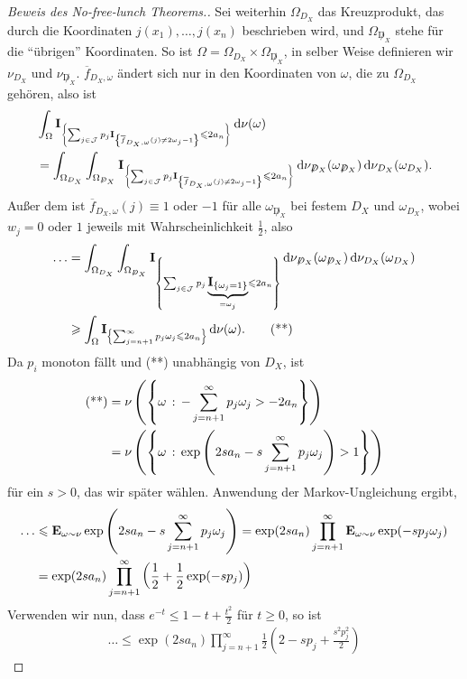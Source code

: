 \begin{proof}[Beweis des No-free-lunch Theorems.]
Sei weiterhin $\Omega_{D_X}$ das Kreuzprodukt, das durch die Koordinaten
$j(x_1),\ldots,j(x_n)$ beschrieben wird, und $\Omega_{\not
D_X}$ stehe für die ``übrigen'' Koordinaten. So ist $\Omega =
\Omega_{D_X}\times \Omega_{\not D_X}$, in selber Weise definieren wir
$\nu_{D_X}$ und $\nu_{\not D_X}$. $\overline{f}_{D_X,\omega}$ ändert sich nur
in den Koordinaten von $\omega$, die zu $\Omega_{D_X}$ gehören, also ist
\begin{align*}
&\int_\Omega \mathbf{I}_{\left\{ \sum_{j\in\mathcal{J}} p_j
\mathbf{I}_{\left\{ \overline{f}_{D_X,\omega}(j)\neq 2\omega_j -1 \right\}}\leqslant
2a_n \right\}}\,\mathrm{d} \nu(\omega)\\
&=\int_{\Omega_{D_X}} \int_{\Omega_{\not D_X}} \mathbf{I}_{\left\{ \sum_{j\in\mathcal{J}} p_j
\mathbf{I}_{\left\{ \overline{f}_{D_X,\omega}(j)\neq 2\omega_j -1 \right\}}\leqslant
2a_n \right\}}\,\mathrm{d} \nu_{\not D_X}(\omega_{\not D_X})\,\mathrm{d} \nu_{D_X}(\omega_{D_X}).
\end{align*}
Außer dem ist $\overline{f}_{D_X,\omega}(j)\equiv 1$ oder $-1$ für alle
$\omega_{\not D_X}$ bei festem $D_X$ und $\omega_{D_X}$, wobei $w_j=0$ oder $1$
jeweils mit Wahrscheinlichkeit $\frac{1}{2}$, also
\begin{align*}
\ldots &=
\int_{\Omega_{D_X}} \int_{\Omega_{\not D_X}} \mathbf{I}_{\left\{ \sum_{j\in\mathcal{J}} p_j
\underbrace{\mathbf{I}_{\left\{ \omega_j=1 \right\}}}_{=\omega_j}\leqslant
2a_n \right\}}\,\mathrm{d} \nu_{\not D_X}(\omega_{\not D_X})\,\mathrm{d} \nu_{D_X}(\omega_{D_X})\\
&\geqslant
\int_{\Omega} \mathbf{I}_{\left\{ \sum_{j=n+1}^\infty p_j
\omega_j \leqslant 2a_n \right\}}\,\mathrm{d} \nu(\omega).\tag{**}
\end{align*}
Da $p_i$ monoton fällt und (**) unabhängig von $D_X$, ist
\begin{align*}
\text{(**)} &=\nu\left(\left\{ \omega\,:\,-\sum_{j=n+1}^\infty p_j\omega_j > -2a_n\right\}
\right) \\ &= \nu\left(\left\{ \omega\,:\,\exp\left(2sa_n-s\sum_{j=n+1}^\infty
p_j\omega_j\right) > 1\right\} \right) 
\end{align*}
für ein $s>0$, das wir später wählen. Anwendung der Markov-Ungleichung ergibt,
\begin{align*}
\ldots &\leqslant \textbf{E}_{\omega\sim \nu} \exp\left(2sa_n-s\sum_{j=n+1}^\infty
p_j\omega_j\right)
= \exp(2sa_n)\prod_{j=n+1}^\infty \textbf{E}_{\omega\sim \nu} \exp (-sp_j \omega_j)\\
&= \exp(2sa_n)\prod_{j=n+1}^\infty \left(\frac{1}{2}+\frac{1}{2}\exp(-sp_j)
\right)
\end{align*}
Verwenden wir nun, dass $e^{-t} \le 1 - t + \frac{t^2}{2}$ für $t\ge 0$, so ist
\begin{align*}
\ldots \le
\exp(2sa_n)\prod_{j=n+1}^\infty
\frac{1}{2}\left(2 - sp_j + \frac{s^2p_j^2}{2}\right) 

\end{align*}
\end{proof}
